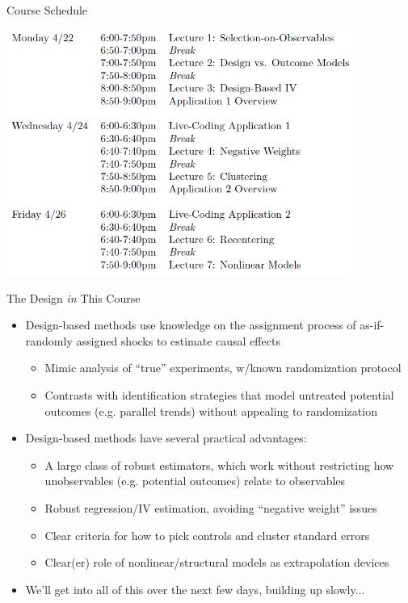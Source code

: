 \documentclass[11pt, english]{beamer}
\begin{document}
	\begin{frame}{Course Schedule}
		\begin{center}
			\includegraphics[width=0.85\textwidth]{figures/schedule.png}
		\end{center}
	\end{frame}

	\begin{frame}{The Design \emph{in} This Course}
		\begin{itemize}
			\item Design-based methods use knowledge on the assignment process of as-if-randomly
				assigned shocks to estimate causal effects
				\smallskip
				\begin{itemize}
					\item Mimic analysis of ``true'' experiments, w/known randomization
						protocol
						\smallskip

					\item Contrasts with identification strategies that model untreated potential
						outcomes (e.g. parallel trends) without appealing to randomization
				\end{itemize}
				\bigskip
				\pause{}

			\item Design-based methods have several practical advantages:
				\smallskip
				\begin{itemize}
					\item A large class of robust estimators, which work without
						restricting how unobservables (e.g. potential outcomes) relate to observables
						\smallskip
						\pause{}

					\item Robust regression/IV estimation, avoiding ``negative weight''
						issues
						\smallskip
						\pause{}

					\item Clear criteria for how to pick controls and cluster standard errors
						\smallskip
						\pause{}

					\item Clear(er) role of nonlinear/structural models as extrapolation
						devices
				\end{itemize}
				\bigskip
				\pause{}

			\item We'll get into all of this over the next few days, building up
				slowly...
		\end{itemize}
	\end{frame}
\end{document}
